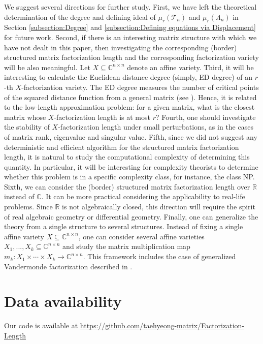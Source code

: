 \documentclass[reqno]{amsart}
\theoremstyle{definition}
\numberwithin{equation}{section}
\begin{document}
We suggest several directions for further study. First, we have left the theoretical determination of the degree and defining ideal of $\mu_r(\mathcal{T}_n)$ and $\mu_r(\Lambda_n)$ in Section \ref{subsection:Degree} and \ref{subsection:Defining equations via Displacement} for future work. Second, if there is an interesting matrix structure with which we have not dealt in this paper, then investigating the corresponding (border) structured matrix factorization length and the corresponding factorization variety will be also meaningful. Let $X \subseteq \mathbb{C}^{n \times n}$ denote an affine variety. Third, it will be interesting to calculate the Euclidean distance degree (simply, ED degree) of an $r$-th $X$-factorization variety. The ED degree measures the number of critical points of the squared distance function from a general matrix (see \cite{draisma2016euclidean}). Hence, it is related to the low-length approximation problem: for a given matrix, what is the closest matrix whose $X$-factorization length is at most $r$? Fourth, one should investigate the stability of $X$-factorization length under small perturbations, as in the cases of matrix rank, eigenvalue and singular value.  Fifth, since we did not suggest any deterministic and efficient algorithm for the structured matrix factorization length, it is natural to study the computational complexity of determining this quantity. In particular, it will be interesting for complexity theorists to determine whether this problem is in a specific complexity class, for instance, the class NP. Sixth, we can consider the (border) structured matrix factorization length over $\mathbb{R}$ instead of $\mathbb{C}$. It can be more practical considering the applicability to real-life problems. Since $\mathbb{R}$ is not algebraically closed, this direction will require the spirit of real algebraic geometry or differential geometry. Finally, one can generalize the theory from a single structure to several structures. Instead of fixing a single affine variety $X \subseteq \mathbb{C}^{n \times n}$, one can consider several affine varieties $X_1,...,X_k \subseteq \mathbb{C}^{n \times n}$ and study the matrix multiplication map $m_k:X_1 \times \cdots \times X_k \rightarrow \mathbb{C}^{n \times n}$. This framework includes the case of generalized Vandermonde factorization described in \cite[Section 6.2]{ye2017new}.

\section*{Data availability}
Our code is available at \url{https://github.com/taehyeong-matrix/Factorization-Length}



\end{document}
